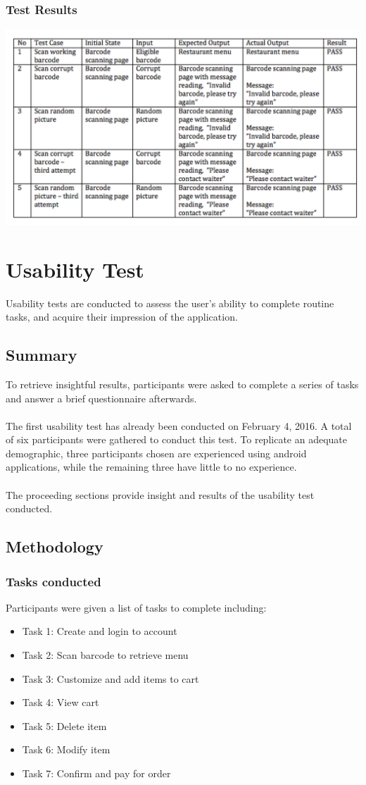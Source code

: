 \documentclass[12pt, titlepage]{article}
\begin{document}
\subsubsection{Test Results}
\includegraphics[width=1.2\textwidth]{barcodeTable.png}

\section{Usability Test}
Usability tests are conducted to assess the user's ability to complete routine tasks, and acquire their impression of the application.
\subsection{Summary}

To retrieve insightful results, participants were asked to complete a series of tasks and answer a brief questionnaire afterwards. 
\\\\
The first usability test has already been conducted on February 4, 2016. A total of six participants were gathered to conduct this test. To replicate an adequate demographic, three participants chosen are experienced using android applications, while the remaining three have little to no experience. 
\\\\
The proceeding sections provide insight and results of the usability test conducted. 

\subsection{Methodology}

\subsubsection{Tasks conducted}
Participants were given a list of tasks to complete including: 
\begin{itemize}  
\item Task 1: Create and login to account
\item Task 2: Scan barcode to retrieve menu
\item Task 3: Customize and add items to cart
\item Task 4: View cart
\item Task 5: Delete item
\item Task 6: Modify item
\item Task 7: Confirm and pay for order
\end{itemize}
\end{document}
